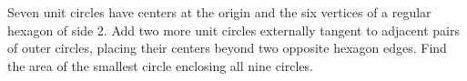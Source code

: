 Seven unit circles have centers at the origin and the six vertices of a regular hexagon of side 2. Add two more unit circles externally tangent to adjacent pairs of outer circles, placing their centers beyond two opposite hexagon edges. Find the area of the smallest circle enclosing all nine circles.
